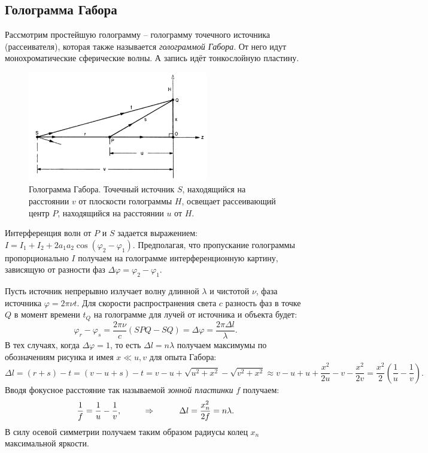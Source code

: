 \subsection{Голограмма Габора}
Рассмотрим простейшую голограмму -- голограмму точечного источника (рассеивателя), которая также называется \textit{голограммой Габора}. От него идут монохроматические сферические волны. А запись идёт тонкослойную пластину.
\begin{figure}[h]
     \centering
     \includegraphics[width=0.7\textwidth]{figures/gabor_point.png}
     \caption{Голограмма Габора. Точечный источник $S$, находящийся на расстоянии $v$ от плоскости голограммы $H$, освещает рассеивающий центр $P$, находящийся на расстоянии $u$ от $H$. 
	}
 \end{figure}
Интерференция волн от $P$ и $S$ задается выражением: $I = I_1 + I_2 + 2 a_1 a_2 \cos (\varphi_2 - \varphi_1)$. Предполагая, что пропускание голограммы пропорционально $I$ получаем на голограмме интерференционную картину, зависящую от разности фаз $\Delta \varphi = \varphi_2 - \varphi_1$.

Пусть источник непрерывно излучает волну длинной $\lambda$ и чистотой $\nu$, фаза источника $\varphi = 2 \pi \nu t$.
Для скорости распространения света $c$ разность фаз в точке $Q$ в момент времени $t_Q$ на голограмме для лучей от источника и объекта будет:
\begin{equation*}
	\varphi_r - \varphi_s = \frac{2 \pi \nu}{c} (SPQ - SQ) = \Delta \varphi = \frac{2 \pi \Delta l}{\lambda}.
\end{equation*}
В тех случаях, когда $\Delta \varphi = 1$, то есть $\Delta l = n \lambda$ получаем максимумы по обозначениям рисунка и имея $x \ll u,v$ для опыта Габора:
\begin{equation*}
	\Delta l = (r+s) - t = (v - u + s) - t = v - u + \sqrt{u^2 + x^2} - \sqrt{v^2 + x^2} \approx v - u + u + \frac{x^2}{2 u} - v - \frac{x^2}{2 v} = \frac{x^2}{2}\left(\frac{1}{u} - \frac{1}{v}\right).
\end{equation*}
Вводя фокусное расстояние так называемой \textit{зонной пластинки} $f$ получаем:
\begin{equation*}
 	\frac{1}{f} = \frac{1}{u} - \frac{1}{v},
 	\hspace{1 cm}
 	\Rightarrow
 	\hspace{1 cm}
 	\Delta l = \frac{x_n^2}{2 f} = n \lambda.
 \end{equation*} 
 В силу осевой симметрии получаем таким образом радиусы колец $x_n$ максимальной яркости.

